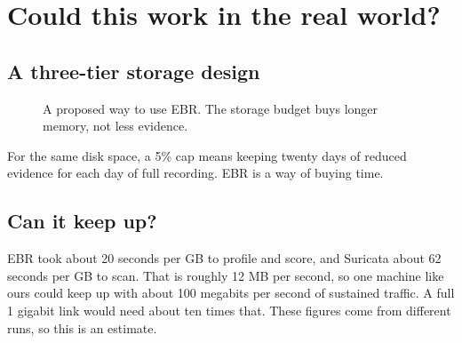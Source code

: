\chapter{Could this work in the real world?}

\section{A three-tier storage design}
\begin{figure}[H]
\centering
{}
\caption{A proposed way to use EBR. The storage budget buys longer memory, not less evidence.}
\end{figure}

For the same disk space, a 5\% cap means keeping twenty days of reduced evidence for each day of full recording. EBR is a way of buying time.

\section{Can it keep up?}
\begin{example}
EBR took about 20 seconds per GB to profile and score, and Suricata about 62 seconds per GB to scan. That is roughly 12 MB per second, so one machine like ours could keep up with about 100 megabits per second of sustained traffic. A full 1 gigabit link would need about ten times that. These figures come from different runs, so this is an estimate.
\end{example}

